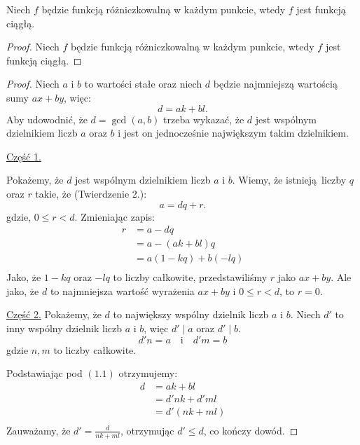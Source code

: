 \begin{example}
  Niech $f$ będzie funkcją różniczkowalną w każdym punkcie,
  wtedy $f$ jest funkcją ciągłą.
\end{example}

\begin{proof}
  Niech $f$ będzie funkcją różniczkowalną
  w każdym punkcie, wtedy $f$ jest funkcją ciągłą.
\end{proof}

\begin{proof}
  Niech $a$ i $b$ to wartości stałe
  oraz niech $d$ będzie najmniejszą wartością
  sumy $ax + by$, więc:
  \begin{equation}
    d = ak + bl.
  \end{equation}
  Aby udowodnić, że $d = \gcd(a, b)$ trzeba wykazać,
  że $d$ jest wspólnym dzielnikiem liczb $a$ oraz $b$
  i jest on jednocześnie największym takim dzielnikiem.

  \vspace{1em}

  \noindent\underline{Część 1.}

  Pokażemy, że $d$ jest wspólnym dzielnikiem liczb $a$ i $b$.
  Wiemy, że istnieją liczby $q$ oraz $r$ takie, że (Twierdzenie 2.):
  \[
    a = dq + r
  .\]
  gdzie, $0 \leq r < d$. Zmieniając zapis:
  \begin{align*}
    r &= a - dq \\ %
      &= a - (ak + bl)q \\
      &= a(1 - kq) + b(-lq) \\
  \end{align*}
  Jako, że $1 - kq$ oraz  $-lq$ to liczby całkowite, przedstawiliśmy
  $r$ jako $ax + by$. Ale jako, że $d$ to najmniejsza wartość wyrażenia
  $ax + by$ i $0 \leq r < d$, to $r = 0$.

  \vspace{1em}

  \noindent\underline{Część 2.}
  Pokażemy, że $d$ to największy wspólny dzielnik liczb $a$ i $b$.
  Niech $d'$ to inny wspólny dzielnik liczb $a$ i $b$, więc
  $d' \mid a$ oraz $d' \mid b$.
  \[
    d'n = a \quad \mathrm{i} \quad d'm = b
  \]
  gdzie $n, m$ to liczby całkowite.

  Podstawiając pod  $(1.1)$ otrzymujemy:
  \begin{align*}
    d &= ak + bl \\
      &= d'nk + d'ml \\
      &= d'(nk + ml) \\
  \end{align*}
  Zauważamy, że $d' = \frac{d}{nk + ml}$, otrzymując $d' \leq d$, co kończy dowód.
\end{proof}
